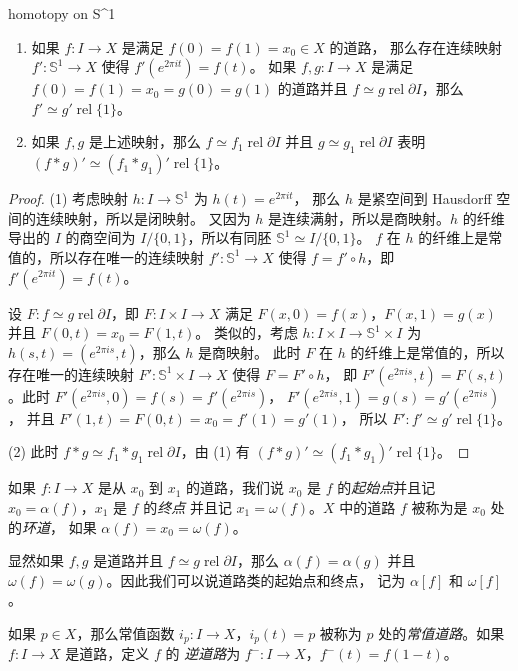 \documentclass[fontset=none]{Notes}
\DeclareMathOperator\rel{rel}
\newcommand{\partI}{\partial I}
\newcommand{\relhomo}{\rel\partI}
\begin{document}
\begin{problem}{}{homotopy on S^1}
  \begin{enumerate}
    \item 如果 $f:I\to X$ 是满足 $f(0)=f(1)=x_0\in X$ 的道路，
    那么存在连续映射 $f':\mathbb{S}^1\to X$ 使得 $f'(e^{2\pi it})=f(t)$。
    如果 $f,g:I\to X$ 是满足 $f(0)=f(1)=x_0=g(0)=g(1)$ 的道路并且
    $f\simeq g\relhomo$，那么 $f'\simeq g'\rel\{1\}$。
    \item 如果 $f,g$ 是上述映射，那么 $f\simeq f_1\relhomo$
    并且 $g\simeq g_1\relhomo$ 表明 $(f*g)'\simeq (f_1*g_1)'\rel\{1\}$。
  \end{enumerate}
\end{problem}
\begin{proof}
  (1) 考虑映射 $h:I\to \mathbb{S}^1$ 为 $h(t)=e^{2\pi it}$，
  那么 $h$ 是紧空间到 Hausdorff 空间的连续映射，所以是闭映射。
  又因为 $h$ 是连续满射，所以是商映射。$h$ 的纤维导出的 $I$
  的商空间为 $I/\{0,1\}$，所以有同胚 $\mathbb{S}^1\simeq I/\{0,1\}$。
  $f$ 在 $h$ 的纤维上是常值的，所以存在唯一的连续映射 $f':\mathbb{S}^1\to X$
  使得 $f=f'\circ h$，即 $f'(e^{2\pi i t})=f(t)$。

  设 $F:f\simeq g\relhomo$，即 $F:I\times I\to X$ 满足
  $F(x,0)=f(x)$，$F(x,1)=g(x)$ 并且 $F(0,t)=x_0=F(1,t)$。
  类似的，考虑 $h:I\times I\to \mathbb{S}^1\times I$ 为
  $h(s,t)=(e^{2\pi i s},t)$，那么 $h$ 是商映射。
  此时 $F$ 在 $h$ 的纤维上是常值的，所以存在唯一的连续映射
  $F':\mathbb{S}^1\times I\to X$ 使得 $F=F'\circ h$，
  即 $F'(e^{2\pi i s},t)=F(s,t)$。此时
  $F'(e^{2\pi is},0)=f(s)=f'(e^{2\pi i s})$，
  $F'(e^{2\pi is},1)=g(s)=g'(e^{2\pi i s})$，
  并且 $F'(1,t)=F(0,t)=x_0=f'(1)=g'(1)$，
  所以 $F':f'\simeq g'\rel\{1\}$。

  (2) 此时 $f*g\simeq f_1*g_1\relhomo$，由 (1) 有
  $(f*g)'\simeq (f_1*g_1)'\rel\{1\}$。
\end{proof}

\begin{definition}
  如果 $f:I\to X$ 是从 $x_0$ 到 $x_1$ 的道路，我们说 $x_0$ 是 $f$
  的\emph{起始点}并且记 $x_0=\alpha(f)$，$x_1$ 是 $f$ 的\emph{终点}
  并且记 $x_1=\omega(f)$。$X$ 中的道路 $f$ 被称为是 $x_0$ 处的\emph{环道}，
  如果 $\alpha(f)=x_0=\omega(f)$。
\end{definition}

显然如果 $f,g$ 是道路并且 $f\simeq g\relhomo$，那么 $\alpha(f)=\alpha(g)$
并且 $\omega(f)=\omega(g)$。因此我们可以说道路类的起始点和终点，
记为 $\alpha[f]$ 和 $\omega[f]$。

\begin{definition}
  如果 $p\in X$，那么常值函数 $i_p:I\to X$，$i_p(t)=p$ 被称为
  $p$ 处的\emph{常值道路}。如果 $f:I\to X$ 是道路，定义 $f$ 的
  \emph{逆道路}为 $f^-:I\to X$，$f^-(t)=f(1-t)$。
\end{definition}
\end{document}
